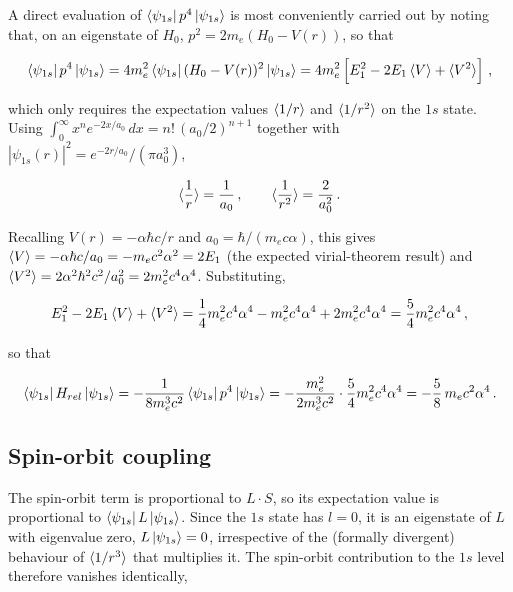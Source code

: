 \begin{appendices}
A direct evaluation of $\bra{\psi_{1s}} p^4 \ket{\psi_{1s}}$ is most conveniently carried out by noting that, on an eigenstate of $H_0$, $p^2 = 2m_e (H_0 - V(r))$, so that

\begin{equation}
\bra{\psi_{1s}} p^4 \ket{\psi_{1s}} = 4 m_e^2 \bra{\psi_{1s}} (H_0 - V(r))^2 \ket{\psi_{1s}} = 4 m_e^2 \left[ E_1^2 - 2 E_1 \braket{V} + \braket{V^2} \right] \, ,
\end{equation}

which only requires the expectation values $\braket{1/r}$ and $\braket{1/r^2}$ on the $1s$ state. Using $\int_0^\infty x^n e^{-2x/a_0}\, dx = n! \, (a_0/2)^{n+1}$ together with $|\psi_{1s}(r)|^2 = e^{-2r/a_0}/(\pi a_0^3)$,

\begin{equation}
\braket{\frac{1}{r}} = \frac{1}{a_0} \, , \qquad \braket{\frac{1}{r^2}} = \frac{2}{a_0^2} \, .
\end{equation}

Recalling $V(r) = -\alpha \hbar c/r$ and $a_0 = \hbar/(m_ec\alpha)$, this gives $\braket{V} = -\alpha \hbar c/a_0 = -m_ec^2\alpha^2 = 2E_1$ (the expected virial-theorem result) and $\braket{V^2} = 2\alpha^2\hbar^2c^2/a_0^2 = 2m_e^2c^4\alpha^4$. Substituting,

\begin{equation}
E_1^2 - 2E_1\braket{V} + \braket{V^2} = \frac{1}{4}m_e^2c^4\alpha^4 - m_e^2c^4\alpha^4 + 2m_e^2c^4\alpha^4 = \frac{5}{4} m_e^2c^4\alpha^4 \, ,
\end{equation}

so that

\begin{equation}
\bra{\psi_{1s}} H_{rel} \ket{\psi_{1s}} = -\frac{1}{8m_e^3c^2} \bra{\psi_{1s}} p^4 \ket{\psi_{1s}} = -\frac{m_e^2}{2m_e^3c^2} \cdot \frac{5}{4} m_e^2c^4\alpha^4 = -\frac{5}{8}\, m_e c^2 \alpha^4 \, .
\end{equation}

\subsection*{Spin-orbit coupling}

The spin-orbit term is proportional to $L \cdot S$, so its expectation value is proportional to $\bra{\psi_{1s}} L \ket{\psi_{1s}}$. Since the $1s$ state has $l=0$, it is an eigenstate of $L$ with eigenvalue zero, $L\ket{\psi_{1s}} = 0$, irrespective of the (formally divergent) behaviour of $\braket{1/r^3}$ that multiplies it. The spin-orbit contribution to the $1s$ level therefore vanishes identically,


\end{appendices}
